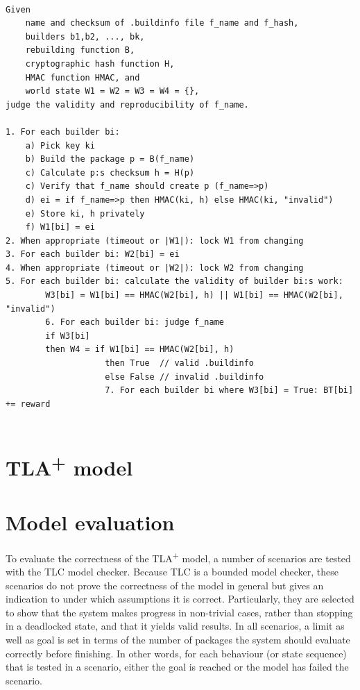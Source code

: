 \documentclass[english, biblatex, digitaloutput]{kththesis}
\begin{document}
\begin{lstlisting}[tabsize=4]
	
Given 	
	name and checksum of .buildinfo file f_name and f_hash, 
	builders b1,b2, ..., bk,
	rebuilding function B,
	cryptographic hash function H,
	HMAC function HMAC, and
	world state W1 = W2 = W3 = W4 = {},
judge the validity and reproducibility of f_name.

1. For each builder bi:
	a) Pick key ki
	b) Build the package p = B(f_name)
	c) Calculate p:s checksum h = H(p)
	c) Verify that f_name should create p (f_name=>p)
	d) ei = if f_name=>p then HMAC(ki, h) else HMAC(ki, "invalid")
	e) Store ki, h privately
	f) W1[bi] = ei
2. When appropriate (timeout or |W1|): lock W1 from changing
3. For each builder bi: W2[bi] = ei
4. When appropriate (timeout or |W2|): lock W2 from changing
5. For each builder bi: calculate the validity of builder bi:s work:
		W3[bi] = W1[bi] == HMAC(W2[bi], h) || W1[bi] == HMAC(W2[bi], "invalid")
		6. For each builder bi: judge f_name
		if W3[bi]
		then W4 = if W1[bi] == HMAC(W2[bi], h)
					then True  // valid .buildinfo
					else False // invalid .buildinfo
					7. For each builder bi where W3[bi] = True: BT[bi] += reward
						
\end{lstlisting}

\section{TLA\textsuperscript+ model}



\section{Model evaluation}

To evaluate the correctness of the TLA\textsuperscript+ model, a number of scenarios are tested with the TLC model checker. Because TLC is a bounded model checker, these scenarios do not prove the correctness of the model in general but gives an indication to under which assumptions it is correct. Particularly, they are selected to show that the system makes progress in non-trivial cases, rather than stopping in a deadlocked state, and that it yields valid results. In all scenarios, a limit as well as goal is set in terms of the number of packages the system should evaluate correctly before finishing. In other words, for each behaviour (or state sequence) that is tested in a scenario, either the goal is reached or the model has failed the scenario.
\end{document}

